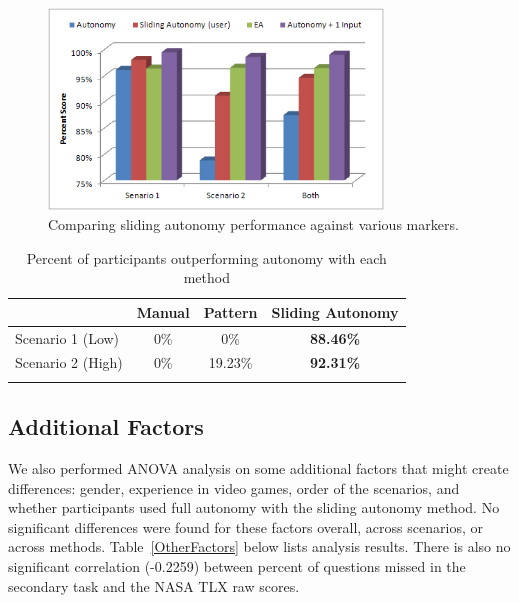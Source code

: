 \documentclass[lettersize, apacite, twoside, HRI]{apa_HRI}
\begin{document}
\begin{figure}
\centering
\includegraphics[width=3.5in]{PerformanceMarkers.JPG}
\caption{Comparing sliding autonomy performance against various markers.}
\label{PerformanceMarkers}
\end{figure}

\begin{table}
\caption{Percent of participants outperforming autonomy with each method}
	\centering
		\begin{tabular}
			{|l|c|c|c|}
			\hline
			 & Manual & Pattern & Sliding Autonomy \\
			\hline
			Scenario 1 (Low) & 0\% & 0\% & \textbf{88.46\%} \\
			\hline
			Scenario 2 (High) & 0\% & 19.23\% & \textbf{92.31\%} \\
			\hline			
			\multicolumn{4}{c}{}  %
		\end{tabular}
\label{CompareToFullAutonomy}
\end{table}

\subsection{Additional Factors}

We also performed ANOVA analysis on some additional factors that might create differences: gender, experience in video games, order of the scenarios, and whether participants used full autonomy with the sliding autonomy method. No significant differences were found for these factors overall, across scenarios, or across methods. Table~\ref{OtherFactors} below lists analysis results. There is also no significant correlation (-0.2259) between percent of questions missed in the secondary task and the NASA TLX raw scores.
\end{document}
